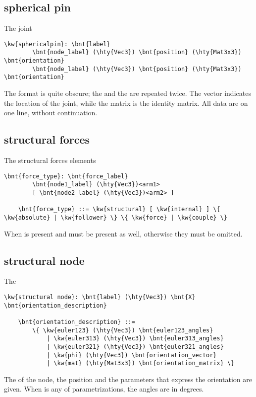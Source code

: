 \subsection{spherical pin}
The  joint
\begin{Verbatim}[commandchars=\\\{\}]
    \kw{sphericalpin}: \bnt{label}
        \bnt{node_label} (\hty{Vec3}) \bnt{position} (\hty{Mat3x3}) \bnt{orientation}
        \bnt{node_label} (\hty{Vec3}) \bnt{position} (\hty{Mat3x3}) \bnt{orientation}
\end{Verbatim}
The format is quite obscure; the  and the 
are repeated twice.
The vector  indicates the location of the joint,
while the matrix  is the identity matrix.
All data are on one line, without continuation.

\subsection{structural forces}
The structural forces elements
\begin{Verbatim}[commandchars=\\\{\}]
    \bnt{force_type}: \bnt{force_label}
        \bnt{node1_label} (\hty{Vec3})<arm1>
        [ \bnt{node2_label} (\hty{Vec3})<arm2> ]

    \bnt{force_type} ::= \kw{structural} [ \kw{internal} ] \{ \kw{absolute} | \kw{follower} \} \{ \kw{force} | \kw{couple} \}
\end{Verbatim}
When  is present  and  must be present
as well, otherwise they must be omitted.

\subsection{structural node}
\label{sec:APP:LOGFILE:STRUCTURAL_NODE}
The 
\begin{Verbatim}[commandchars=\\\{\}]
    \kw{structural node}: \bnt{label} (\hty{Vec3}) \bnt{X} \bnt{orientation_description}

    \bnt{orientation_description} ::=
        \{ \kw{euler123} (\hty{Vec3}) \bnt{euler123_angles}
            | \kw{euler313} (\hty{Vec3}) \bnt{euler313_angles}
            | \kw{euler321} (\hty{Vec3}) \bnt{euler321_angles}
            | \kw{phi} (\hty{Vec3}) \bnt{orientation_vector}
            | \kw{mat} (\hty{Mat3x3}) \bnt{orientation_matrix} \}
\end{Verbatim}
The  of the node, the position 
and the  parameters that express the orientation
are given.
When  is any of  parametrizations,
the angles are in degrees.

